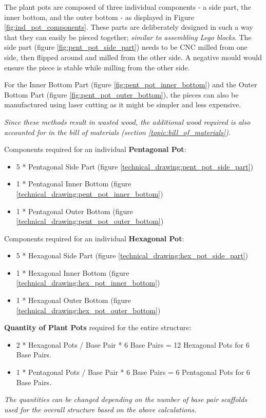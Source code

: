 \documentclass[12pt]{extarticle} %
\begin{document}
The plant pots are composed of three individual components - a side part, the inner bottom, and the outer bottom - as displayed in Figure \ref{fig:ind_pot_components}. \label{topic:CNC_Milling} These parts are deliberately designed in such a way that they can easily be pieced together; \textit{similar to assembling Lego blocks}. 
\label{topic:CNC_milling_side_part}The side part (figure \ref{fig:pent_pot_side_part}) needs to be CNC milled from one side, then flipped around and milled from the other side. A negative mould would ensure the piece is stable while milling from the other side. 

For the Inner Bottom Part (figure \ref{fig:pent_pot_inner_bottom}) and the Outer Bottom Part (figure \ref{fig:pent_pot_outer_bottom}), the pieces can also be manufactured using laser cutting as it might be simpler and less expensive. 

\textit{Since these methods result in wasted wood, the additional wood required is also accounted for in the bill of materials (section \ref{topic:bill_of_materials}).} 

\hspace{0.1cm}

Components required for an individual \textbf{Pentagonal Pot}:
\begin{itemize}
    \item 5 * Pentagonal Side Part (figure \ref{technical_drawing:pent_pot_side_part})
    \item 1 * Pentagonal Inner Bottom (figure \ref{technical_drawing:pent_pot_inner_bottom})
    \item 1 * Pentagonal Outer Bottom (figure \ref{technical_drawing:pent_pot_outer_bottom})
\end{itemize}

Components required for an individual \textbf{Hexagonal Pot}:
\begin{itemize}
    \item 5 * Hexagonal Side Part (figure \ref{technical_drawing:hex_pot_side_part})
    \item 1 * Hexagonal Inner Bottom (figure \ref{technical_drawing:hex_pot_inner_bottom})
    \item 1 * Hexagonal Outer Bottom (figure \ref{technical_drawing:hex_pot_outer_bottom})
\end{itemize}

\textbf{Quantity of Plant Pots} required for the entire structure:
\begin{itemize}
    \item 2 * Hexagonal Pots / Base Pair * 6 Base Pairs = 12 Hexagonal Pots for 6 Base Pairs.
    \item 1 * Pentagonal Pots / Base Pair * 6 Base Pairs = 6 Pentagonal Pots for 6 Base Pairs.
\end{itemize}
\textit{The quantities can be changed depending on the number of base pair scaffolds used for the overall structure based on the above calculations. }
\end{document}
